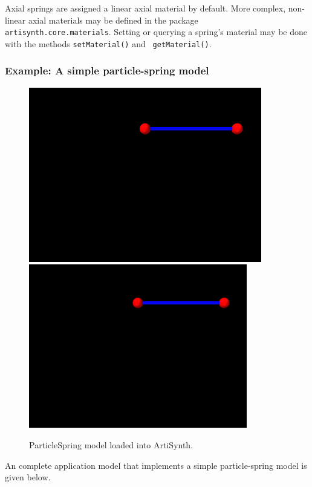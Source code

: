 Axial springs are assigned a linear axial material by default.  More
complex, non-linear axial materials may be defined in the package {\tt
artisynth.core.materials}. Setting or querying a spring's material
may be done with the methods {\tt setMaterial()} and {\tt
getMaterial()}.

\subsubsection{Example: A simple particle-spring model}
\label{ParticleSpringExample:sec}

\begin{figure}[t]
\begin{center}
\iflatexml
 \includegraphics[]{images/ParticleSpring}
\else
 \includegraphics[width=3.75in]{images/ParticleSpring}
\fi
\end{center}
\caption{ParticleSpring model loaded into ArtiSynth.}
\label{ParticleSpring:fig}
\end{figure}

An complete application model that implements a simple particle-spring
model is given below. 
\lstset{numbers=left}

\lstset{numbers=none}

